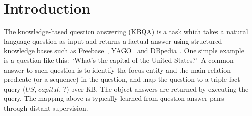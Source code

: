 \section{Introduction}




The knowledge-based question answering (KBQA) is a task which 
takes a natural language question as input and returns a factual answer 
using structured knowledge bases
such as Freebase~\cite{bollacker2008freebase},
YAGO~\cite{suchanek2007yago} and DBpedia~\cite{auer2007dbpedia}.
One simple example is a question like this: ``What's the capital of the United States?''
A common answer to such question is to identify the focus entity
and the main relation predicate (or a sequence) in the question, and 
map the question to a triple fact query ($US$, $capital$, $?$) over KB.
The object answers are returned by executing the query.
The mapping above is typically learned from question-answer pairs
through distant supervision.

